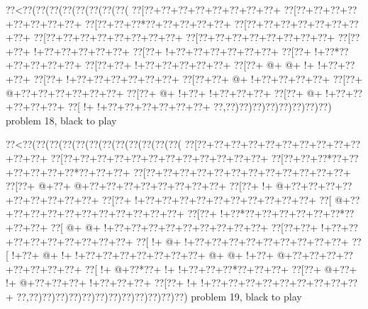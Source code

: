 \vbox{\vbox{\goo
\0??<\0??(\0??(\0??(\0??(\0??(\0??(\0??(\0??(
\0??[\0??+\0??+\0??+\0??+\0??+\0??+\0??+\0??+
\0??[\0??+\0??+\0??+\0??+\0??+\0??+\0??+\0??+
\0??[\0??+\0??+\0??*\0??+\0??+\0??+\0??+\0??+
\0??[\0??+\0??+\0??+\0??+\0??+\0??+\0??+\0??+
\0??[\0??+\0??+\0??+\0??+\0??+\0??+\0??+\0??+
\0??[\0??+\0??+\0??+\0??+\0??+\0??+\0??+\0??+
\0??[\0??+\0??+\- !+\0??+\0??+\0??+\0??+\0??+
\0??[\0??+\- !+\0??+\0??+\0??+\0??+\0??+\0??+
\0??[\0??+\- !+\0??*\0??+\0??+\0??+\0??+\0??+
\0??[\0??+\0??+\- !+\0??+\0??+\0??+\0??+\0??+
\0??[\0??+\- @+\- @+\- !+\- !+\0??+\0??+\0??+
\0??[\0??+\- !+\0??+\0??+\0??+\0??+\0??+\0??+
\0??[\0??+\0??+\- @+\- !+\0??+\0??+\0??+\0??+
\0??[\0??+\- @+\0??+\0??+\0??+\0??+\0??+\0??+
\0??[\0??+\- @+\- !+\0??+\- !+\0??+\0??+\0??+
\0??[\0??+\- @+\- !+\0??+\0??+\0??+\0??+\0??+
\0??[\- !+\- !+\0??+\0??+\0??+\0??+\0??+\0??+
\0??,\0??)\0??)\0??)\0??)\0??)\0??)\0??)\0??)
}
\hfil problem 18, black to play\hfil\break
}

\vbox{\vbox{\goo
\0??<\0??(\0??(\0??(\0??(\0??(\0??(\0??(\0??(\0??(\0??(\0??(\0??(
\0??[\0??+\0??+\0??+\0??+\0??+\0??+\0??+\0??+\0??+\0??+\0??+\0??+
\0??[\0??+\0??+\0??+\0??+\0??+\0??+\0??+\0??+\0??+\0??+\0??+\0??+
\0??[\0??+\0??+\0??*\0??+\0??+\0??+\0??+\0??+\0??*\0??+\0??+\0??+
\0??[\0??+\0??+\0??+\0??+\0??+\0??+\0??+\0??+\0??+\0??+\0??+\0??+
\0??[\0??+\- @+\0??+\- @+\0??+\0??+\0??+\0??+\0??+\0??+\0??+\0??+
\0??[\0??+\- !+\- @+\0??+\0??+\0??+\0??+\0??+\0??+\0??+\0??+\0??+
\0??[\0??+\- !+\0??+\0??+\0??+\0??+\0??+\0??+\0??+\0??+\0??+\0??+
\0??[\- @+\0??+\0??+\0??+\0??+\0??+\0??+\0??+\0??+\0??+\0??+\0??+
\0??[\0??+\- !+\0??*\0??+\0??+\0??+\0??+\0??+\0??*\0??+\0??+\0??+
\0??[\- @+\- @+\- !+\0??+\0??+\0??+\0??+\0??+\0??+\0??+\0??+\0??+
\0??[\0??+\0??+\- !+\0??+\0??+\0??+\0??+\0??+\0??+\0??+\0??+\0??+
\0??[\- !+\- @+\- !+\0??+\0??+\0??+\0??+\0??+\0??+\0??+\0??+\0??+
\0??[\- !+\0??+\- @+\- !+\- !+\0??+\0??+\0??+\0??+\0??+\0??+\0??+
\- @+\- @+\- !+\0??+\- @+\0??+\0??+\0??+\0??+\0??+\0??+\0??+\0??+
\0??[\- !+\- @+\0??*\0??+\- !+\- !+\0??+\0??+\0??*\0??+\0??+\0??+
\0??[\0??+\- @+\0??+\- !+\- @+\0??+\0??+\0??+\- !+\0??+\0??+\0??+
\0??[\0??+\- !+\- !+\0??+\0??+\0??+\0??+\0??+\0??+\0??+\0??+\0??+
\0??,\0??)\0??)\0??)\0??)\0??)\0??)\0??)\0??)\0??)\0??)\0??)\0??)
}
\hfil problem 19, black to play\hfil\break
}

